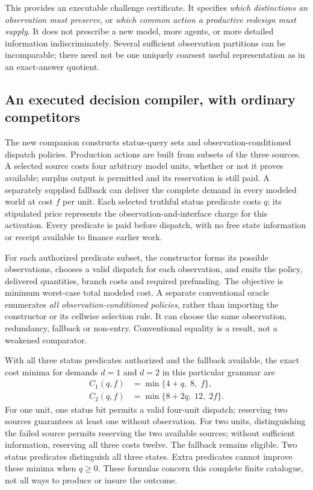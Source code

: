 This provides an executable challenge certificate. It specifies \emph{which distinctions an observation must preserve}, or \emph{which common action a productive redesign must supply}. It does not prescribe a new model, more agents, or more detailed information indiscriminately. Several sufficient observation partitions can be incomparable; there need not be one uniquely coarsest useful representation as in an exact-answer quotient.

\subsection{An executed decision compiler, with ordinary competitors}
The new companion constructs status-query sets and observation-conditioned dispatch policies. Production actions are built from subsets of the three sources. A selected source costs four arbitrary model units, whether or not it proves available; surplus output is permitted and its reservation is still paid. A separately supplied fallback can deliver the complete demand in every modeled world at cost $f$ per unit. Each selected truthful status predicate costs $q$; its stipulated price represents the observation-and-interface charge for this activation. Every predicate is paid before dispatch, with no free state information or receipt available to finance earlier work.

For each authorized predicate subset, the constructor forms its possible observations, chooses a valid dispatch for each observation, and emits the policy, delivered quantities, branch costs and required prefunding. The objective is minimum worst-case total modeled cost. A separate conventional oracle enumerates \emph{all observation-conditioned policies}, rather than importing the constructor or its cellwise selection rule. It can choose the same observation, redundancy, fallback or non-entry. Conventional equality is a result, not a weakened comparator.

With all three status predicates authorized and the fallback available, the exact cost minima for demands $d=1$ and $d=2$ in this particular grammar are
\begin{align}
C_1(q,f)&=\min\{4+q,\;8,\;f\},\\
C_2(q,f)&=\min\{8+2q,\;12,\;2f\}.
\label{eq:decisioncost}
\end{align}
For one unit, one status bit permits a valid four-unit dispatch; reserving two sources guarantees at least one without observation. For two units, distinguishing the failed source permits reserving the two available sources; without sufficient information, reserving all three costs twelve. The fallback remains eligible. Two status predicates distinguish all three states. Extra predicates cannot improve these minima when $q\geq0$. These formulas concern this complete finite catalogue, not all ways to produce or insure the outcome.

